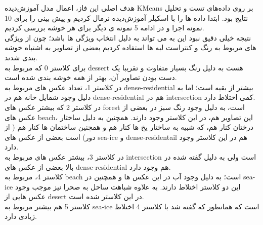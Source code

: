 \documentclass[a4paper,12pt]{article}
\begin{document}
	هدف اصلی این فاز، اعمال مدل آموزش‌دیده KMeans بر روی داده‌های تست و تحلیل نتایج بود. 
ابتدا داده ها را با اسکیلر آموزش‌دیده نرمال کردیم و پیش بینی را برای 10 نمونه اجرا و در ادامه 5 نمونه ی دیگر برای هر خوشه بررسی کردیم.
\\
نتیجه خیلی دقیق نبود این به می تواند به دلیل انتخاب ویژگی ها باشد؛ چون از ویژگی های مربوط به رنگ و  کنتراست لبه ها استفاده کردیم بعضی از تصاویر به اشتباه خوشه بندی شدند.
\\
برای کلاستر 0 که مربوط به dessert هست به دلیل رنگ بسیار متفاوت و تقریبا یک دست بودن تصاویر آن، بهتر از همه خوشه بندی شده است.
\\
در کلاستر 1، تعداد عکس های مربوط به dense-residential بیشتر از بقیه است؛ اما به دلیل وجود شمایل خانه هم در dense-residential هم در intersection کمی اختلاط دارد.
\\
در کلاستر 2 که بیشتر عکس های forest است، به دلیل وجود رنگ سبز در بعضی از عکس های beach، این تصاویر هم، در این کلاستر وجود دارند. همچنین به دلیل ساختار درختان کنار هم، که شبیه به ساختار یخ ها کنار هم و همچنین ساختمان ها کنار هم ( از دور)   است بعضی از عکس های sea-ice و dense-residentail هم در این کلاستر وجود دارد.
\\
در کلاستر 3، بیشتر عکس های مربوط به intersection است ولی به دلیل گفته شده در بالا بعضی از عکس های dense-residential هم وجود دارد.
\\
کلاستر 4، مربوط به beach است؛ به دلیل وجود آب در این عکس ها و همچنین در sea-ice این دو کلاستر اختلاط دارند. به علاوه شباهت ساحل به صحرا نیز موجب وجود عکس هایی از  desert در این کلاستر شده است.
\\
کلاستر 5 هم بیشتر مربوط به sea-ice است که همانطور که گفته شد با کلاستر 4 اختلاط زیادی دارد.
\end{document}
